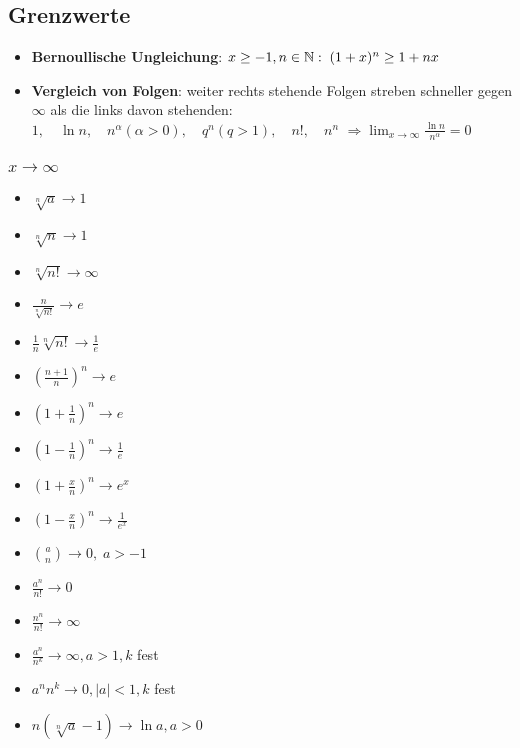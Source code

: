 \subsection{Grenzwerte}
\begin{itemize}[leftmargin=*]
	\item \textbf{Bernoullische Ungleichung}: $x \geq -1, n \in \mathbb{N}: \; (1+x)^n \geq
	1+nx$
	\item \textbf{Vergleich von Folgen}: weiter rechts stehende Folgen streben
	schneller gegen $\infty$ als die links davon stehenden: $1, \quad \ln n, \quad
	n^\alpha (\alpha > 0), \quad q^n (q > 1), \quad n!, \quad n^n$ $\Rightarrow
	\lim_{x \to \infty} \frac{\ln n}{n^\alpha} = 0$
\end{itemize}
\subsubsection{$x \rightarrow \infty$}
\begin{multicols}{2}
\begin{itemize}[leftmargin=*]
	\item $\sqrt[n]{a} \rightarrow 1$
	\item $\sqrt[n]{n} \rightarrow 1$
	\item $\sqrt[n]{n!} \rightarrow \infty$
	\item $\frac{n}{\sqrt[n]{n!}} \rightarrow e$
	\item $\frac{1}{n} \sqrt[n]{n!} \rightarrow \frac{1}{e}$
	\item $\left ( \frac{n+1}{n} \right )^n \rightarrow e$
	\item $\left ( 1 + \frac{1}{n} \right )^n \rightarrow e$
	\item $\left ( 1 - \frac{1}{n} \right )^n \rightarrow \frac{1}{e}$
	\item $\left ( 1 + \frac{x}{n} \right )^n \rightarrow e^x$
	\item $\left ( 1 - \frac{x}{n} \right )^n \rightarrow \frac{1}{e^x}$
	\item ${a \choose n} \rightarrow 0, \; a > -1$
	\item $\frac{a^n}{n!} \rightarrow 0$
	\item $\frac{n^n}{n!} \rightarrow \infty$
	\item $\frac{a^n}{n^k} \rightarrow \infty, a > 1, k$ fest
	\item $a^n n^k \rightarrow 0, |a| < 1, k$ fest
	\item $n(\sqrt[n]{a} - 1) \rightarrow \ln a, a > 0$
\end{itemize}
\end{multicols}
